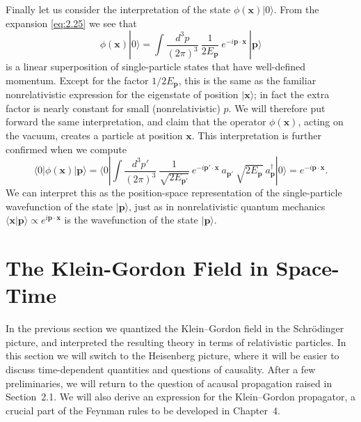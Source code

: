 Finally let us consider the interpretation of the state $\phi(\mathbf{x})
|0\rangle$.  From the expansion \eqref{eq:2.25} we see that
\begin{equation}
  \phi(\mathbf{x})|0\rangle = \int \frac{d^3p}{(2\pi)^3}\
    \frac{1}{2E_{\mathbf{p}}}\ e^{-i\mathbf{p}\cdot\mathbf{x}}\
    |\mathbf{p}\rangle
  \label{eq:2.41}
\end{equation}
is a linear superposition of single-particle states that have well-defined
momentum.  Except for the factor $1/2E_{\mathbf{p}}$, this is the same as
the familiar nonrelativistic expression for the eigenstate of position
$|\mathbf{x}\rangle$; in fact the extra factor is nearly constant for small
(nonrelativistic) $p$.  We will therefore put forward the same
interpretation, and claim that the operator $\phi(\mathbf{x})$, acting on
the vacuum, creates a particle at position $\mathbf{x}$.  This
interpretation is further confirmed when we compute
\begin{equation}
  \langle 0|\phi(\mathbf{x})|\mathbf{p}\rangle
    = \langle 0| \int \frac{d^3p'}{(2\pi)^3}\
      \frac{1}{\sqrt{2E_{\mathbf{p}'}}}\ e^{-i\mathbf{p}'\cdot\mathbf{x}}\
      a_{\mathbf{p}'}\ \sqrt{2E_{\mathbf{p}}}\ a_{\mathbf{p}}^\dagger|0\rangle
    = e^{-i\mathbf{p}\cdot\mathbf{x}} .
  \label{eq:2.42}
\end{equation}
We can interpret this as the position-space representation of the
single-particle wavefunction of the state $|\mathbf{p}\rangle$, just as in
nonrelativistic quantum mechanics $\langle\mathbf{x}|\mathbf{p}\rangle
\propto e^{i\mathbf{p}\cdot\mathbf{x}}$ is the wavefunction of the state
$|\mathbf{p}\rangle$.

\section{The Klein-Gordon Field in Space-Time}

In the previous section we quantized the Klein--Gordon field in the
Schr\"odinger picture, and interpreted the resulting theory in terms of
relativistic particles.  In this section we will switch to the Heisenberg
picture, where it will be easier to discuss time-dependent quantities and
questions of causality.  After a few preliminaries, we will return to the
question of acausal propagation raised in Section~2.1.  We will also derive
an expression for the Klein--Gordon propagator, a crucial part of the
Feynman rules to be developed in Chapter~4.

